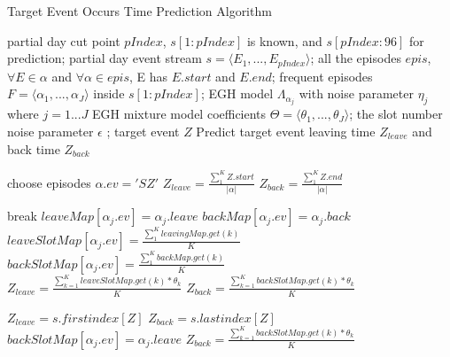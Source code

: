 \renewcommand{\algorithmicrequire}{\textbf{Input:}}
\renewcommand{\algorithmicensure}{\textbf{Output:}}

\begin{algorithm}
\caption{ Target Event Occurs Time Prediction Algorithm}
\label{alg22}
\begin{algorithmic} [1]
\REQUIRE 
partial day cut point $pIndex$, $s[1:pIndex]$ is known,  and $s[pIndex:96]$ for prediction;
partial day event stream $s=\langle E_1,..., E_{pIndex} \rangle$;
all the episodes $epis$, $\forall E \in \alpha$ and $\forall \alpha \in epis$, E has $E.{start}$ 
and $E.{end}$; 
frequent episodes $F=\langle \alpha_1,..., \alpha_J \rangle$ inside $s[1:pIndex]$;
EGH model $\Lambda_{\alpha_j}$ with noise parameter $\eta_j$ where $j=1...J$
EGH mixture model coefficients $\Theta=\langle \theta_1,...,\theta_J \rangle$;
the slot number noise parameter $\epsilon$  ; 
target event $Z$
\ENSURE Predict target event leaving time $Z_{leave}$ and back time $Z_{back}$
 
\STATE choose episodes $\alpha.ev={'SZ'}$ 
\STATE $Z_{leave} = \frac{\sum_1^K Z.start}{|\alpha|} $
\STATE $Z_{back} = \frac{\sum_1^K  Z.end}{|\alpha|}  $

\STATE break
\ENDIF
{}
\STATE $leaveMap[\alpha_j.ev]=\alpha_j.leave$
\ENDIF
{}
\STATE $backMap[\alpha_j.ev]=\alpha_j.back$
\ENDIF 
\ENDFOR
{} %
\STATE $leaveSlotMap[\alpha_j.ev] =\frac{\sum_1^K leavingMap.get(k)}{K}$
\STATE $backSlotMap[\alpha_j.ev] = \frac{\sum_1^K backMap.get(k)}{K}$
\ENDIF %
\\
\STATE $Z_{leave}= \frac { \sum_{k=1}^K leaveSlotMap.get(k) * \theta_k } {K}$
\STATE $Z_{back}= \frac { \sum_{k=1}^K backSlotMap.get(k) * \theta_k } {K}$
\ENDIF
\ENDIF %

\ENDIF %

\STATE $Z_{leave}=s.firstindex[Z]$ %
\STATE $Z_{back}=s.lastindex[Z]$ %
\\
\STATE $backSlotMap[\alpha_j.ev] = \alpha_j.leave$
\ENDIF
\ENDFOR
\STATE $Z_{back}= \frac { \sum_{k=1}^K backSlotMap.get(k) * \theta_k } {K}$
\ENDIF
\ENDIF


\end{algorithmic}
\end{algorithm}
